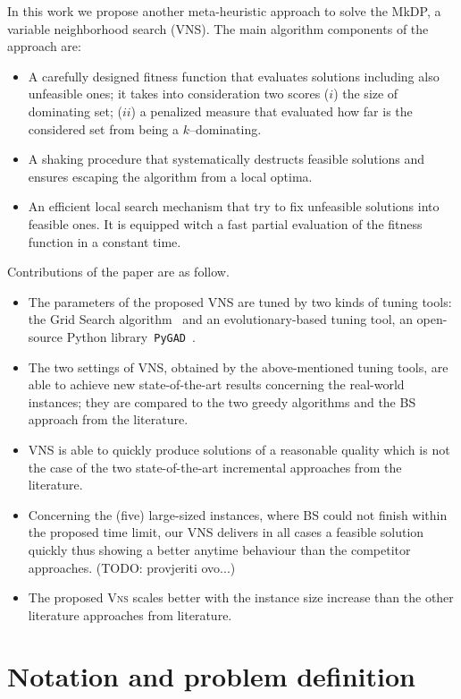 \documentclass[sigconf]{acmart}
\begin{document}
In this work we propose another meta-heuristic approach to solve the MkDP, a variable neighborhood search (VNS). The main algorithm components of the approach are:
\begin{itemize}
	\item A carefully designed fitness function that evaluates solutions  including also unfeasible ones; it takes into consideration two scores ($i$) the size of dominating set; ($ii$) a penalized measure that evaluated how far is the considered set from being a $k$--dominating. 
	\item A shaking procedure that systematically destructs feasible solutions and ensures escaping the algorithm from a local optima.
	\item An efficient local search mechanism that try to fix unfeasible solutions into feasible ones. It is equipped witch a fast partial evaluation of the fitness function in a constant time.
 
\end{itemize}
Contributions of the paper are as follow.
\begin{itemize}
	\item The parameters of the proposed VNS are tuned by two kinds of tuning tools: the Grid Search algorithm~\cite{ranjan2019k} and an evolutionary-based tuning tool, an open-source Python library~\texttt{PyGAD}~\cite{gad2021pygad}.  
	\item The two settings of VNS, obtained by the above-mentioned tuning tools, are able to achieve new state-of-the-art results concerning the real-world instances; they are compared to the two greedy algorithms and the BS approach from the literature. 
	\item VNS is able to quickly produce solutions of a reasonable quality which is not the case of the two state-of-the-art incremental approaches from the literature.
	\item Concerning the (five) large-sized instances, where BS could not finish within the proposed time limit, our VNS delivers in all cases a feasible solution quickly thus showing a better anytime behaviour than the competitor approaches. (TODO: provjeriti ovo...)
	\item The proposed \textsc{Vns} scales better with the instance size increase than the other literature approaches from literature. 
\end{itemize}

\section{Notation and problem definition }
    
\end{document}
